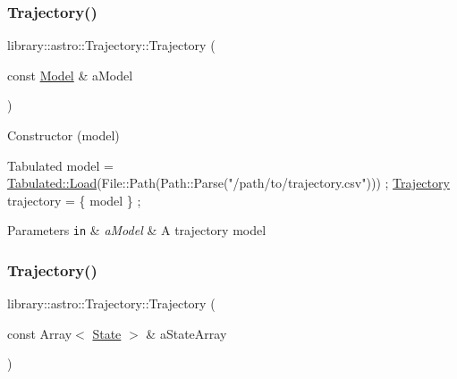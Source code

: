 \subsubsection{\texorpdfstring{Trajectory()}{Trajectory()}\hspace{0.1cm}{\footnotesize\ttfamily [1/3]}}
{\footnotesize\ttfamily library\+::astro\+::\+Trajectory\+::\+Trajectory (\begin{DoxyParamCaption}\item[{const \hyperlink{classlibrary_1_1astro_1_1trajectory_1_1_model}{Model} \&}]{a\+Model }\end{DoxyParamCaption})}



Constructor (model) 


\begin{DoxyCode}
Tabulated model = \hyperlink{classlibrary_1_1astro_1_1trajectory_1_1models_1_1_tabulated_a63c053c7a308930aa03b354292c85c0f}{Tabulated::Load}(File::Path(Path::Parse(\textcolor{stringliteral}{"/path/to/trajectory.csv"}))) ;
\hyperlink{classlibrary_1_1astro_1_1_trajectory_a8e5c7740915ca947e067c0f419ac1c65}{Trajectory} trajectory = \{ model \} ;
\end{DoxyCode}



\begin{DoxyParams}[1]{Parameters}
\mbox{\tt in}  & {\em a\+Model} & A trajectory model \\
\hline
\end{DoxyParams}
\mbox{\label{classlibrary_1_1astro_1_1_trajectory_abe42247164ca6f966ae5f0c2dfa29182}} 
\subsubsection{\texorpdfstring{Trajectory()}{Trajectory()}\hspace{0.1cm}{\footnotesize\ttfamily [2/3]}}
{\footnotesize\ttfamily library\+::astro\+::\+Trajectory\+::\+Trajectory (\begin{DoxyParamCaption}\item[{const Array$<$ \hyperlink{classlibrary_1_1astro_1_1trajectory_1_1_state}{State} $>$ \&}]{a\+State\+Array }\end{DoxyParamCaption})}



